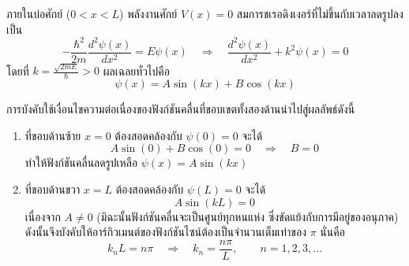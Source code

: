 ภายในบ่อศักย์ ($0 < x < L$) พลังงานศักย์ $V(x) = 0$ สมการชเรอดิงเงอร์ที่ไม่ขึ้นกับเวลาลดรูปลงเป็น
\begin{equation}
-\frac{\hbar^2}{2m}\frac{d^2\psi(x)}{dx^2} = E\psi(x) \quad \Longrightarrow \quad \frac{d^2\psi(x)}{dx^2} + k^2\psi(x) = 0
\end{equation}
โดยที่ $k = \frac{\sqrt{2mE}}{\hbar} > 0$ ผลเฉลยทั่วไปคือ
\begin{equation}
\psi(x) = A \sin(kx) + B \cos(kx)
\end{equation}

การบังคับใช้เงื่อนไขความต่อเนื่องของฟังก์ชันคลื่นที่ขอบเขตทั้งสองด้านนำไปสู่ผลลัพธ์ดังนี้
\begin{enumerate}
    \item ที่ขอบด้านซ้าย $x = 0$ ต้องสอดคล้องกับ $\psi(0) = 0$ จะได้
    \begin{equation}
    A \sin(0) + B \cos(0) = 0 \quad \Longrightarrow \quad B = 0
    \end{equation}
    ทำให้ฟังก์ชันคลื่นลดรูปเหลือ $\psi(x) = A \sin(kx)$
    
    \item ที่ขอบด้านขวา $x = L$ ต้องสอดคล้องกับ $\psi(L) = 0$ จะได้
    \begin{equation}
    A \sin(kL) = 0
    \end{equation}
    เนื่องจาก $A \ne 0$ (มิฉะนั้นฟังก์ชันคลื่นจะเป็นศูนย์ทุกหนแห่ง ซึ่งขัดแย้งกับการมีอยู่ของอนุภาค) ดังนั้นจึงบังคับให้อาร์กิวเมนต์ของฟังก์ชันไซน์ต้องเป็นจำนวนเต็มเท่าของ $\pi$ นั่นคือ
    \begin{equation}
    k_n L = n\pi \quad \Longrightarrow \quad k_n = \frac{n\pi}{L}, \qquad n = 1, 2, 3, \dots
    \end{equation}
\end{enumerate}

